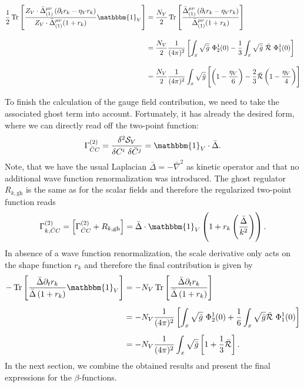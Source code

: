 \begin{align}
	\frac{1}{2}\tr{\frac{Z_V\cdot\bar{\Delta}^{\mu\nu}_{(1)}\left(\partial_t r_k - \eta_Vr_k\right)}{Z_V\cdot\bar{\Delta}^{\mu\nu}_{(1)}(1+r_k)}\mathbbm{1}_V} &= \frac{N_V}{2}\tr{\frac{\bar{\Delta}^{\mu\nu}_{(1)}\left(\partial_t r_k - \eta_Vr_k\right)}{\bar{\Delta}^{\mu\nu}_{(1)}(1+r_k)}}\nonumber \\[10pt]
	&= \frac{N_V}{2}\frac{1}{(4\pi)^2}\left[\int_x\sqrt{\bar{g}}\ \Phi_2^1(0) - \frac{1}{3}\int_x\sqrt{\bar{g}}\  \bar{\mathcal{R}} \  \Phi_1^1(0) \right] \\[10pt]
	&=  \frac{N_V}{2}\frac{1}{(4\pi)^2}\int_x\sqrt{\bar{g}}\left[\left(1-\frac{\eta_V}{6}\right)- \frac{2}{3}\bar{\mathcal{R}}\left(1-\frac{\eta_V}{4}\right)\right]\nonumber
\end{align}


To finish the calculation of the gauge field contribution, we need to take the associated ghost term into account. Fortunately, it has already the desired form, where we can directly read off the two-point function:
\begin{equation}
	\Gamma^{(2)}_{\bar{C}C} = \frac{\delta^2 \mathcal{S}_V}{\delta C^{i}\ \delta \bar{C}^{j}} = \mathbbm{1}_V\cdot\bar{\Delta}.
\end{equation} 
Note, that we have the usual Laplacian $\bar{\Delta} = -\bar{\nabla}^2$ as kinetic operator and that no additional wave function renormalization was introduced. The ghost regulator $R_{k, \mathrm{gh}}$ is the same as for the scalar fields and therefore the regularized two-point function reads
\begin{equation}
		\Gamma^{(2)}_{k, \bar{C}C} = \left[\Gamma^{(2)}_{ \bar{C}C}+ R_{k, \mathrm{gh}}\right]  = \bar{\Delta}\cdot\mathbbm{1}_V\left(1 + r_k\left(\frac{\bar{\Delta}}{k^2}\right)\right).
\end{equation} 
In absence of a wave function renormalization, the scale derivative only acts on the shape function $r_k$ and  therefore the final contribution is given by 
\begin{equation}
\begin{aligned}
	-\tr{\frac{\bar{\Delta}\partial_tr_k}{\bar{\Delta}\left(1+r_k\right)}\mathbbm{1}_V} &= -N_{V}\tr{\frac{\bar{\Delta}\partial_tr_k}{\bar{\Delta}\left(1+r_k\right)}} \\[5pt]
	&= -N_V\frac{1}{(4\pi)^2}\left[\int_x\sqrt{\bar{g}} \ \Phi_2^1(0) + \frac{1}{6}\int_x\sqrt{\bar{g}} \bar{\mathcal{R}} \ \Phi_1^1(0) \right] \\[5pt]
	&= -N_V\frac{1}{(4\pi)^2}\int_x\sqrt{\bar{g}}\left[1 + \frac{1}{3}\bar{\mathcal{R}}\right].	
\end{aligned}
\end{equation}  
In the next section, we combine the obtained results and present the final expressions for the $\beta$-functions.
 
